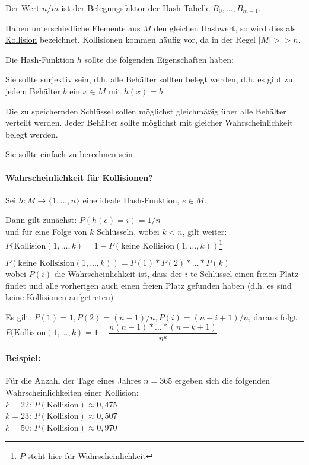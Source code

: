 Der Wert $n/m$ ist der \ul{Belegungsfaktor} der Hash-Tabelle $B_0, \ldots, B_{m−1}$.

Haben unterschiedliche Elemente aus $M$ den gleichen Hashwert, so wird dies als \ul{Kollision} bezeichnet. Kollisionen kommen häufig vor, da in der Regel $|M| >> n$.

Die Hash-Funktion $h$ sollte die folgenden Eigenschaften haben:
\begin{compactitem}
	\item Sie sollte surjektiv sein, d.h. alle Behälter sollten belegt werden, d.h. es gibt zu jedem Behälter $b$ ein $x \in M$ mit $h(x) = b$
	\item Die zu speichernden Schlüssel sollen möglichst gleichmäßig über alle Behälter verteilt werden. Jeder Behälter sollte möglichst mit gleicher Wahrscheinlichkeit belegt werden.
	\item Sie sollte {\flqq einfach\frqq} zu berechnen sein
\end{compactitem}

\paragraph{Wahrscheinlichkeit für Kollisionen?} Sei $h : M \to \{1, \ldots, n\}$ eine ideale Hash-Funktion, $e \in M$.

Dann gilt zunächst: $P(h(e) = i) = 1/n$\\
und für eine Folge von $k$ Schlüsseln, wobei $k<n$, gilt weiter:\\
$P(\text{Kollision}(1, \ldots, k) = 1- P(\text{keine Kollision}(1, \ldots, k))$\footnote{$P$ steht hier für Wahrscheinlichkeit}

$P(\text{keine Kollsision}(1, \ldots, k)) = P(1) * P(2) * \ldots * P(k)$\\
wobei $P(i)$ die Wahrscheinlichkeit ist, dass der $i$-te Schlüssel einen freien Platz findet und alle vorherigen auch einen freien Platz gefunden haben (d.h. es sind keine Kollisionen aufgetreten)

Es gilt: $P(1) = 1, P(2) = (n-1)/n, P(i) = (n-i+1)/n$, daraus folgt\\
$P(\text{Kollision}(1, \ldots, k) = 1-\dfrac{n(n-1) * \ldots * (n-k+1)}{n^k}$

\paragraph{Beispiel:} Für die Anzahl der Tage eines Jahres $n = 365$ ergeben sich die folgenden Wahrscheinlichkeiten einer Kollision:\\
$k = 22$: $P(\text{Kollision}) \approx 0{,}475$\\
$k = 23$: $P(\text{Kollision}) \approx 0{,}507$\\
$k = 50$: $P(\text{Kollision}) \approx 0{,}970$

